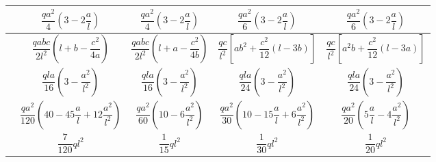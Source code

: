 \begin{table}[H]
{\begin{tabular}{m{4cm}cccc}
         & $\dfrac{qa^2}{4}\left(3-2\dfrac{a}{l}\right)$ & $\dfrac{qa^2}{4}\left(3-2\dfrac{a}{l}\right)$ & $\dfrac{qa^2}{6}\left(3-2\dfrac{a}{l}\right)$ & $\dfrac{qa^2}{6}\left(3-2\dfrac{a}{l}\right)$ \\ \midrule
         & $\dfrac{qabc}{2l^2}\left(l+b-\dfrac{c^2}{4a}\right)$ & $\dfrac{qabc}{2l^2}\left(l+a-\dfrac{c^2}{4b}\right)$ & $\dfrac{qc}{l^2}\left[ab^2+\dfrac{c^2}{12}\left(l-3b\right)\right]$ & $\dfrac{qc}{l^2}\left[a^2b+\dfrac{c^2}{12}\left(l-3a\right)\right]$ \\ \midrule
         & $\dfrac{qla}{16}\left(3-\dfrac{a^2}{l^2}\right)$ & $\dfrac{qla}{16}\left(3-\dfrac{a^2}{l^2}\right)$ & $\dfrac{qla}{24}\left(3-\dfrac{a^2}{l^2}\right)$ & $\dfrac{qla}{24}\left(3-\dfrac{a^2}{l^2}\right)$ \\ \midrule
         & $\dfrac{qa^2}{120}\left(40-45\dfrac{a}{l}+12\dfrac{a^2}{l^2}\right)$ & $\dfrac{qa^2}{60}\left(10-6\dfrac{a^2}{l^2}\right)$ & $\dfrac{qa^2}{30}\left(10-15\dfrac{a}{l}+6\dfrac{a^2}{l^2}\right)$ & $\dfrac{qa^2}{20}\left(5\dfrac{a}{l}-4\dfrac{a^2}{l^2}\right)$ \\ \midrule
         & $\dfrac{7}{120}ql^2$ & $\dfrac{1}{15}ql^2$ & $\dfrac{1}{30}ql^2$ & $\dfrac{1}{20}ql^2$ \\ \midrule
    \end{tabular}
	} %
    \label{tab:empotPerf}
\end{table}
